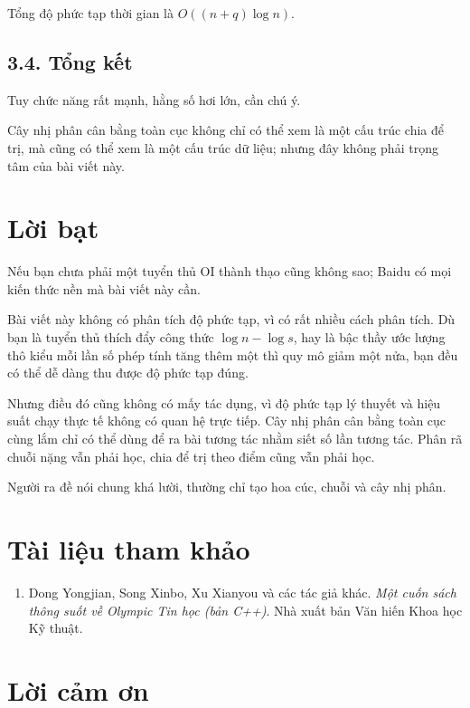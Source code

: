\documentclass[11pt]{article}
\begin{document}
Tổng độ phức tạp thời gian là \(O((n+q)\log n)\).

\subsection*{3.4. Tổng kết}

Tuy chức năng rất mạnh, hằng số hơi lớn, cần chú ý.

Cây nhị phân cân bằng toàn cục không chỉ có thể xem là một cấu trúc chia để
trị, mà cũng có thể xem là một cấu trúc dữ liệu; nhưng đây không phải trọng
tâm của bài viết này.

\section*{Lời bạt}

Nếu bạn chưa phải một tuyển thủ OI thành thạo cũng không sao; Baidu có mọi
kiến thức nền mà bài viết này cần.

Bài viết này không có phân tích độ phức tạp, vì có rất nhiều cách phân tích.
Dù bạn là tuyển thủ thích đẩy công thức \(\log n-\log s\), hay là bậc thầy
ước lượng thô kiểu mỗi lần số phép tính tăng thêm một thì quy mô giảm một
nửa, bạn đều có thể dễ dàng thu được độ phức tạp đúng.

Nhưng điều đó cũng không có mấy tác dụng, vì độ phức tạp lý thuyết và hiệu
suất chạy thực tế không có quan hệ trực tiếp. Cây nhị phân cân bằng toàn cục
cùng lắm chỉ có thể dùng để ra bài tương tác nhằm siết số lần tương tác. Phân
rã chuỗi nặng vẫn phải học, chia để trị theo điểm cũng vẫn phải học.

Người ra đề nói chung khá lười, thường chỉ tạo hoa cúc, chuỗi và cây nhị phân.

\section*{Tài liệu tham khảo}

\begin{enumerate}
  \item Dong Yongjian, Song Xinbo, Xu Xianyou và các tác giả khác.
        \emph{Một cuốn sách thông suốt về Olympic Tin học (bản C++)}. Nhà xuất
        bản Văn hiến Khoa học Kỹ thuật.
\end{enumerate}

\section*{Lời cảm ơn}
\end{document}
